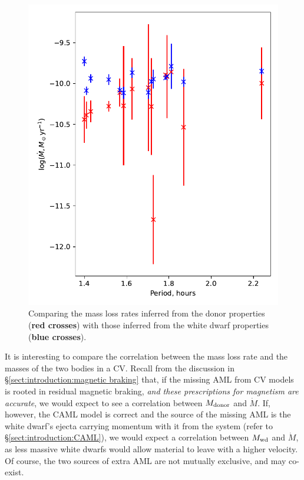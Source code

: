 \begin{figure}
    \centering
    \includegraphics[width=\textwidth]{figures/results/Mdot/compare_mdot_from_donor_vs_wd_vs_period.pdf}
    \caption{Comparing the mass loss rates inferred from the donor properties ({\bf red crosses}) with those inferred from the white dwarf properties ({\bf blue crosses}).}
    \label{fig:discussion:compare Mdot from donor and WD}
\end{figure}

It is interesting to compare the correlation between the mass loss rate and the masses of the two bodies in a CV.
Recall from the discussion in \S\ref{sect:introduction:magnetic braking} that, if the missing AML from CV models is rooted in residual magnetic braking, {\it and these prescriptions for magnetism are accurate}, we would expect to see a correlation between $M_{\rm donor}$ and $\dot M$. If, however, the CAML model is correct and the source of the missing AML is the white dwarf's ejecta carrying momentum with it from the system (refer to \S\ref{sect:introduction:CAML}), we would expect a correlation between $M_{\rm wd}$ and $\dot M$, as less massive white dwarfs would allow material to leave with a higher velocity. Of course, the two sources of extra AML are not mutually exclusive, and may co-exist.

